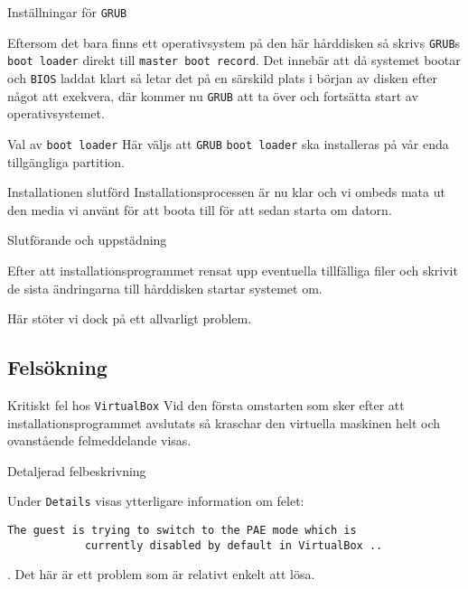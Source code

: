            {Inställningar för \texttt{GRUB}}
           {Eftersom det bara finns ett operativsystem på den här hårddisken så
            skrivs \texttt{GRUB}s \texttt{boot loader} direkt till
            \texttt{master boot record}.
            Det innebär att då systemet bootar och \texttt{BIOS} laddat klart
            så letar det på en särskild plats i början av disken efter något
            att exekvera, där kommer nu \texttt{GRUB} att ta över och fortsätta
            start av operativsystemet.
           {}

           {Val av \texttt{boot loader}}
           {Här väljs att \texttt{GRUB} \texttt{boot loader} ska installeras
            på vår enda tillgängliga partition.}
           {}

           {Installationen slutförd}
           {Installationsprocessen är nu klar och vi ombeds mata ut den media
            vi använt för att boota till för att sedan starta om datorn.}
           {}

           {Slutförande och uppstädning}
           {Efter att installationsprogrammet rensat upp eventuella tillfälliga filer
            och skrivit de sista ändringarna till hårddisken startar systemet om.
            \par Här stöter vi dock på ett allvarligt problem.}
           {}


\subsection{Felsökning}

           {Kritiskt fel hos \texttt{VirtualBox}}
           {Vid den första omstarten som sker efter att installationsprogrammet
            avslutats så kraschar den virtuella maskinen helt och ovanstående
            felmeddelande visas.}
           {}

           {Detaljerad felbeskrivning}
           {Under \texttt{Details} visas ytterligare information om felet:
             \begin{Verbatim}The guest is trying to switch to the PAE mode which is
            currently disabled by default in VirtualBox ..
            \end{Verbatim}. Det här är ett
            problem som är relativt enkelt att lösa.
            }
           {}

}
